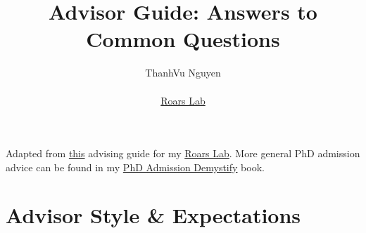 \documentclass{article}
\title{Advisor Guide: Answers to Common Questions}
\author{ThanhVu Nguyen\\\\\href{https://roars.dev}{Roars Lab}}
\date{}
\begin{document}
\maketitle


\tableofcontents

\newpage

Adapted from \href{https://www.cs.columbia.edu/wp-content/uploads/2019/03/Get-Advisor.pdf}{this} advising guide for my 
\href{https://roars.dev}{Roars Lab}. More general PhD admission advice can be found in my \href{https://code.roars.dev/phd-cs-us/}{PhD Admission Demystify} book.


\section{Advisor Style \& Expectations}
\end{document}
